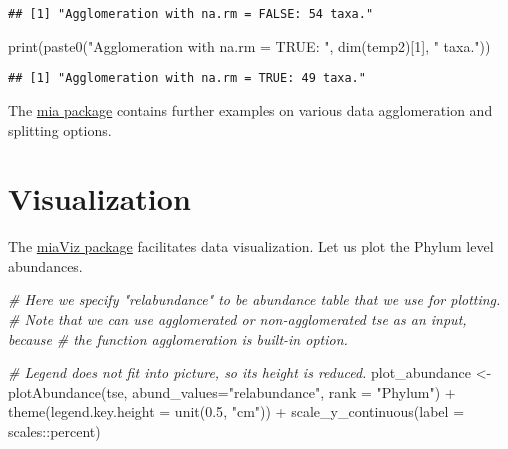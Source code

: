 \documentclass[
]{book}
\newenvironment{Shaded}{\begin{snugshade}}{\end{snugshade}}
\newcommand{\AttributeTok}[1]{\textcolor[rgb]{0.77,0.63,0.00}{#1}}
\newcommand{\CommentTok}[1]{\textcolor[rgb]{0.56,0.35,0.01}{\textit{#1}}}
\newcommand{\DecValTok}[1]{\textcolor[rgb]{0.00,0.00,0.81}{#1}}
\newcommand{\FloatTok}[1]{\textcolor[rgb]{0.00,0.00,0.81}{#1}}
\newcommand{\FunctionTok}[1]{\textcolor[rgb]{0.00,0.00,0.00}{#1}}
\newcommand{\NormalTok}[1]{#1}
\newcommand{\OtherTok}[1]{\textcolor[rgb]{0.56,0.35,0.01}{#1}}
\newcommand{\SpecialCharTok}[1]{\textcolor[rgb]{0.00,0.00,0.00}{#1}}
\newcommand{\StringTok}[1]{\textcolor[rgb]{0.31,0.60,0.02}{#1}}
\begin{document}
\begin{verbatim}
## [1] "Agglomeration with na.rm = FALSE: 54 taxa."
\end{verbatim}

\begin{Shaded}
\begin{Highlighting}[]
\FunctionTok{print}\NormalTok{(}\FunctionTok{paste0}\NormalTok{(}\StringTok{"Agglomeration with na.rm = TRUE: "}\NormalTok{, }\FunctionTok{dim}\NormalTok{(temp2)[}\DecValTok{1}\NormalTok{], }\StringTok{" taxa."}\NormalTok{))}
\end{Highlighting}
\end{Shaded}

\begin{verbatim}
## [1] "Agglomeration with na.rm = TRUE: 49 taxa."
\end{verbatim}

The \href{https://microbiome.github.io/mia/reference/index.html}{mia
package}
contains further examples on various data agglomeration and splitting
options.

\hypertarget{visualization}{%
\section{Visualization}\label{visualization}}

The \href{https://microbiome.github.io/miaViz/}{miaViz package} facilitates
data visualization. Let us plot the Phylum level abundances.

\begin{Shaded}
\begin{Highlighting}[]
\CommentTok{\# Here we specify "relabundance" to be abundance table that we use for plotting.}
\CommentTok{\# Note that we can use agglomerated or non{-}agglomerated tse as an input, because}
\CommentTok{\# the function agglomeration is built{-}in option. }

\CommentTok{\# Legend does not fit into picture, so its height is reduced.}
\NormalTok{plot\_abundance }\OtherTok{\textless{}{-}} \FunctionTok{plotAbundance}\NormalTok{(tse, }\AttributeTok{abund\_values=}\StringTok{"relabundance"}\NormalTok{, }\AttributeTok{rank =} \StringTok{"Phylum"}\NormalTok{) }\SpecialCharTok{+}
  \FunctionTok{theme}\NormalTok{(}\AttributeTok{legend.key.height =} \FunctionTok{unit}\NormalTok{(}\FloatTok{0.5}\NormalTok{, }\StringTok{"cm"}\NormalTok{)) }\SpecialCharTok{+}
  \FunctionTok{scale\_y\_continuous}\NormalTok{(}\AttributeTok{label =}\NormalTok{ scales}\SpecialCharTok{::}\NormalTok{percent)}
\end{Highlighting}
\end{Shaded}
\end{document}
